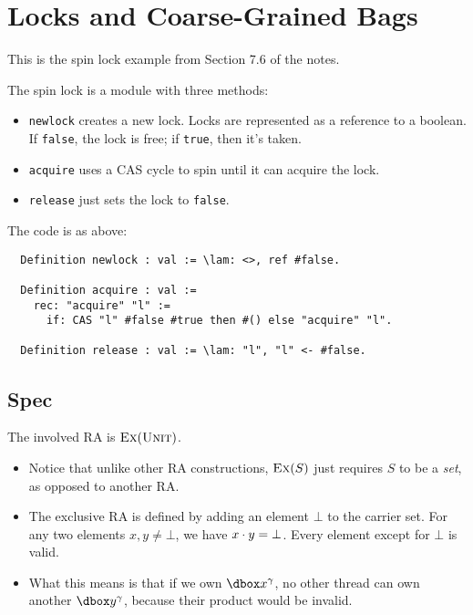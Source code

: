 \section{Locks and Coarse-Grained Bags}
\label{section:locks-and-coarse-graned-bags}


This is the spin lock example from Section 7.6 of the notes.

The spin lock is a module with three methods:
\begin{itemize}

\item \texttt{newlock} creates a new lock. Locks are represented as a reference to a boolean. If \texttt{false}, the lock is free; if \texttt{true}, then it's taken.

\item \texttt{acquire} uses a CAS cycle to spin until it can acquire the lock.

\item  \texttt{release} just sets the lock to \texttt{false}.

\end{itemize}

The code is as above:

\begin{verbatim}
  Definition newlock : val := \lam: <>, ref #false.
    
  Definition acquire : val :=
    rec: "acquire" "l" :=
      if: CAS "l" #false #true then #() else "acquire" "l".
    
  Definition release : val := \lam: "l", "l" <- #false.
\end{verbatim}

\subsection{Spec}

The involved RA is $\textsc{Ex}(\textsc{Unit})$.
\begin{itemize}
\item Notice that unlike other RA constructions, $\textsc{Ex}(S)$ just requires $S$ to be a \emph{set}, as opposed to another RA.

\item The exclusive RA is defined by adding an element $\bot$ to the carrier set. For any two elements $x, y \ne \bot$, we have $x \cdot y = \bot$. Every element except for $\bot$ is valid.

\item What this means is that if we own $\ownr{x}{\gamma}$, no other thread can own another $\ownr{y}{\gamma}$, because their product would be invalid.
\end{itemize}

